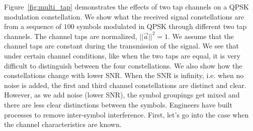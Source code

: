 Figure~\ref{fig:multi_tap} demonstrates the effects of two tap channels on a QPSK modulation constellation.  
We show what the received signal constellations are from a sequence of $100$ symbols modulated in QPSK through different two tap channels.  The channel taps are normalized, $||\vec{a}||^2=1$.  We assume that the channel taps are constant during the transmission of the signal.
We see that under certain channel conditions, like when the two taps are equal, it is very difficult to distinguish between the four constellations.  
We also show how the constellations change with lower SNR.  When the SNR is infinity, i.e. when no noise is added, the first and third channel constellations are distinct and clear.  However, as we add noise (lower SNR), the symbol groupings get mixed and there are less clear distinctions between the symbols.
Engineers have built processes to remove inter-symbol interference.  First, let's go into the case when the channel characteristics are known.

